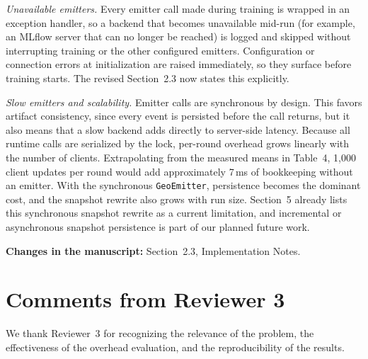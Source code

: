 \documentclass[11pt]{article}
\newcommand{\location}[1]{\noindent\textbf{Changes in the manuscript:} #1}
\begin{document}
\emph{Unavailable emitters.} Every emitter call made during training is wrapped in an exception handler, so a backend that becomes unavailable mid-run (for example, an MLflow server that can no longer be reached) is logged and skipped without interrupting training or the other configured emitters. Configuration or connection errors at initialization are raised immediately, so they surface before training starts. The revised Section~2.3 now states this explicitly.

\emph{Slow emitters and scalability.} Emitter calls are synchronous by design. This favors artifact consistency, since every event is persisted before the call returns, but it also means that a slow backend adds directly to server-side latency. Because all runtime calls are serialized by the lock, per-round overhead grows linearly with the number of clients. Extrapolating from the measured means in Table~4, 1{,}000 client updates per round would add approximately 7\,ms of bookkeeping without an emitter. With the synchronous \texttt{GeoEmitter}, persistence becomes the dominant cost, and the snapshot rewrite also grows with run size. Section~5 already lists this synchronous snapshot rewrite as a current limitation, and incremental or asynchronous snapshot persistence is part of our planned future work.

\location{Section~2.3, Implementation Notes.}

\section*{Comments from Reviewer 3}

We thank Reviewer~3 for recognizing the relevance of the problem, the effectiveness of the overhead evaluation, and the reproducibility of the results.
\end{document}
